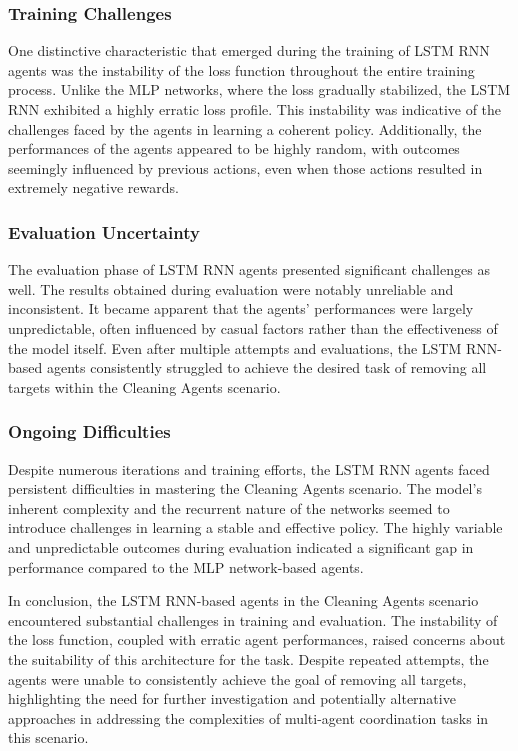 \documentclass{scrartcl}
\begin{document}
\subsubsection{Training Challenges}

One distinctive characteristic that emerged during the training of LSTM RNN agents was the instability of the loss function throughout the entire training process. Unlike the MLP networks, where the loss gradually stabilized, the LSTM RNN exhibited a highly erratic loss profile. This instability was indicative of the challenges faced by the agents in learning a coherent policy. Additionally, the performances of the agents appeared to be highly random, with outcomes seemingly influenced by previous actions, even when those actions resulted in extremely negative rewards.

\subsubsection{Evaluation Uncertainty}

The evaluation phase of LSTM RNN agents presented significant challenges as well. The results obtained during evaluation were notably unreliable and inconsistent. It became apparent that the agents' performances were largely unpredictable, often influenced by casual factors rather than the effectiveness of the model itself. Even after multiple attempts and evaluations, the LSTM RNN-based agents consistently struggled to achieve the desired task of removing all targets within the Cleaning Agents scenario.

\subsubsection{Ongoing Difficulties}

Despite numerous iterations and training efforts, the LSTM RNN agents faced persistent difficulties in mastering the Cleaning Agents scenario. The model's inherent complexity and the recurrent nature of the networks seemed to introduce challenges in learning a stable and effective policy. The highly variable and unpredictable outcomes during evaluation indicated a significant gap in performance compared to the MLP network-based agents.

In conclusion, the LSTM RNN-based agents in the Cleaning Agents scenario encountered substantial challenges in training and evaluation. The instability of the loss function, coupled with erratic agent performances, raised concerns about the suitability of this architecture for the task. Despite repeated attempts, the agents were unable to consistently achieve the goal of removing all targets, highlighting the need for further investigation and potentially alternative approaches in addressing the complexities of multi-agent coordination tasks in this scenario.

\newpage

%
%
\printbibliography %
\end{document}
